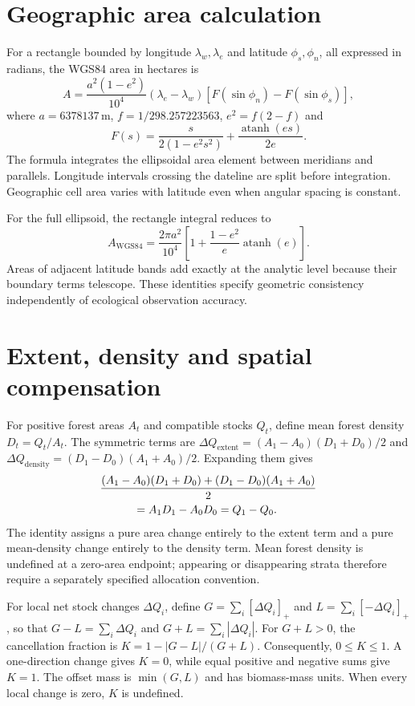 \documentclass[11pt,a4paper]{article}
\begin{document}
\section{Geographic area calculation}

For a rectangle bounded by longitude $\lambda_w,\lambda_e$ and latitude $\phi_s,\phi_n$, all expressed in radians, the WGS84 area in hectares is
\begin{equation}
A=\frac{a^2(1-e^2)}{10^4}(\lambda_e-\lambda_w)\left[F(\sin\phi_n)-F(\sin\phi_s)\right],
\end{equation}
where $a=6378137$\,m, $f=1/298.257223563$, $e^2=f(2-f)$ and
\[
F(s)=\frac{s}{2(1-e^2s^2)}+\frac{\operatorname{atanh}(es)}{2e}.
\]
The formula integrates the ellipsoidal area element between meridians and parallels. Longitude intervals crossing the dateline are split before integration. Geographic cell area varies with latitude even when angular spacing is constant.

For the full ellipsoid, the rectangle integral reduces to
\[
A_{\mathrm{WGS84}}=\frac{2\pi a^2}{10^4}\left[1+\frac{1-e^2}{e}\operatorname{atanh}(e)\right].
\]
Areas of adjacent latitude bands add exactly at the analytic level because their boundary terms telescope. These identities specify geometric consistency independently of ecological observation accuracy.

\section{Extent, density and spatial compensation}

For positive forest areas $A_t$ and compatible stocks $Q_t$, define mean forest density $D_t=Q_t/A_t$. The symmetric terms are $\Delta Q_{\mathrm{extent}}=(A_1-A_0)(D_1+D_0)/2$ and $\Delta Q_{\mathrm{density}}=(D_1-D_0)(A_1+A_0)/2$. Expanding them gives
\begin{align}
&\frac{(A_1-A_0)(D_1+D_0)+(D_1-D_0)(A_1+A_0)}{2}\notag\\
&\hspace{3em}=A_1D_1-A_0D_0=Q_1-Q_0.
\end{align}
The identity assigns a pure area change entirely to the extent term and a pure mean-density change entirely to the density term. Mean forest density is undefined at a zero-area endpoint; appearing or disappearing strata therefore require a separately specified allocation convention.

For local net stock changes $\Delta Q_i$, define $G=\sum_i[\Delta Q_i]_+$ and $L=\sum_i[-\Delta Q_i]_+$, so that $G-L=\sum_i\Delta Q_i$ and $G+L=\sum_i|\Delta Q_i|$. For $G+L>0$, the cancellation fraction is $K=1-|G-L|/(G+L)$. Consequently, $0\le K\le1$. A one-direction change gives $K=0$, while equal positive and negative sums give $K=1$. The offset mass is $\min(G,L)$ and has biomass-mass units. When every local change is zero, $K$ is undefined.
\end{document}
